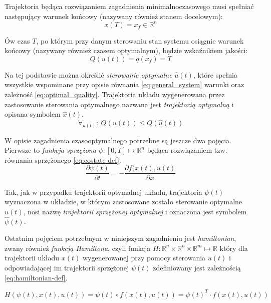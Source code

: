 Trajektoria będąca rozwiązaniem zagadnienia minimalnoczasowego musi spełniać następujący warunek końcowy (nazywany również stanem docelowym):
\begin{equation}\label{eq:final_term}
    x(T) = x_{f} \in \mathbb{R}^{n}
\end{equation}

Ów czas $T$, po którym przy danym sterowaniu stan systemu osiągnie warunek końcowy (nazywany również czasem optymalnym), będzie wskaźnikiem jakości: 
\begin{equation}\label{eq:quality}
    Q(u(t)) = q(x_{f}) = T
\end{equation}

Na tej podstawie można określić \emph{sterowanie optymalne} $\hat{u}(t)$, które spełnia wszystkie wspominane przy opisie równania \ref{eq:general_system} warunki oraz zależność \ref{eq:optimal_quality}. Trajektoria układu wygenerowana przez zastosowanie sterowania optymalnego nazwana jest \emph{trajektorią optymalną} i opisana symbolem $\hat{x}(t)$.
\begin{equation}\label{eq:optimal_quality}
    \forall_{u(t)}:~ Q(u(t)) \leq Q(\hat{u}(t))
\end{equation}

W opisie zagadnienia czasooptymalnego potrzebne są jeszcze dwa pojęcia.
Pierwsze to \emph{funkcja sprzężona} $\psi: [0, T] \longmapsto \mathbb{R}^{n}$ będąca rozwiązaniem tzw. równania sprzężonego \ref{eq:costate-def}.
\begin{equation}\label{eq:costate-def}
\frac{\partial \psi(t)}{\partial t} = - \frac{\partial f(x(t), u(t)}{\partial x}
\end{equation}

Tak, jak w przypadku trajektorii optymalnej układu, trajektoria $\psi(t)$ wyznaczona w układzie, w którym zastosowane zostało sterowanie optymalne $\hat{u}(t)$, nosi nazwę \emph{trajektorii sprzężonej optymalnej} i oznaczona jest symbolem $\hat{\psi}(t)$.

Ostatnim pojęciem potrzebnym w niniejszym zagadnieniu jest \emph{hamiltonian}, zwany również \emph{funkcją Hamiltona}, czyli funkcja $H: \mathbb{R}^{n} \times \mathbb{R}^{n} \times \mathbb{R}^{m} \longmapsto \mathbb{R}$ który dla trajektorii układu $x(t)$ wygenerowanej przy pomocy sterowania $u(t)$ i odpowiadającej im trajektorii sprzężonej $\psi(t)$ zdefiniowany jest zależnością \ref{eq:hamiltonian-def}.

\begin{equation}\label{eq:hamiltonian-def}
H(\psi(t), x(t), u(t)) = \psi(t) \circ f(x(t), u(t)) = \psi(t)^{T} \cdot f(x(t), u(t))
\end{equation}

